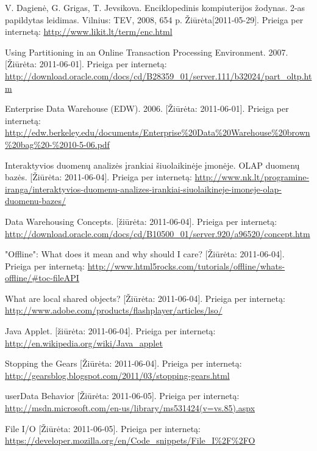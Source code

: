 \documentclass[12pt,a4paper,titlepage]{article}
\begin{document}
\begin{thebibliography}{99}
V. Dagienė, G. Grigas, T. Jevsikova. Enciklopedinis kompiuterijos žodynas. 2-as papildytas leidimas. Vilnius: TEV, 2008, 654 p. Žiūrėta[2011-05-29].  Prieiga per internetą: \url{http://www.likit.lt/term/enc.html}

Using Partitioning in an Online Transaction Processing Environment. 2007. [Žiūrėta: 2011-06-01]. Prieiga per internetą:   \url{http://download.oracle.com/docs/cd/B28359_01/server.111/b32024/part_oltp.htm}
 
Enterprise Data Warehouse (EDW). 2006. [Žiūrėta: 2011-06-01]. Prieiga per internetą:  \url{http://edw.berkeley.edu/documents/Enterprise%20Data%20Warehouse%20brown%20bag%20-%2010-5-06.pdf}

Interaktyvios duomenų analizės įrankiai šiuolaikinėje įmonėje. OLAP duomenų bazės. [Žiūrėta: 2011-06-04]. Prieiga per internetą: \url{http://www.nk.lt/programine-iranga/interaktyvios-duomenu-analizes-irankiai-siuolaikineje-imoneje-olap-duomenu-bazes/}

Data Warehousing Concepts. [žiūrėta: 2011-06-04]. Prieiga per internetą:  \url{http://download.oracle.com/docs/cd/B10500_01/server.920/a96520/concept.htm}

"Offline": What does it mean and why should I care? [Žiūrėta: 2011-06-04]. Prieiga per internetą: 
\url{http://www.html5rocks.com/tutorials/offline/whats-offline/#toc-fileAPI}

What are local shared objects? [Žiūrėta: 2011-06-04]. Prieiga per internetą: \url{http://www.adobe.com/products/flashplayer/articles/lso/}

Java Applet. [žiūrėta: 2011-06-04]. Prieiga per internetą: \url{http://en.wikipedia.org/wiki/Java_applet}

Stopping the Gears [Žiūrėta: 2011-06-04]. Prieiga per internetą: \url{http://gearsblog.blogspot.com/2011/03/stopping-gears.html}

userData Behavior [Žiūrėta: 2011-06-05]. Prieiga per internetą: \url{http://msdn.microsoft.com/en-us/library/ms531424(v=vs.85).aspx}

File I/O [Žiūrėta: 2011-06-05]. Prieiga per internetą: \url{https://developer.mozilla.org/en/Code_snippets/File_I%2F%2FO}

\end{thebibliography}
\end{document}
